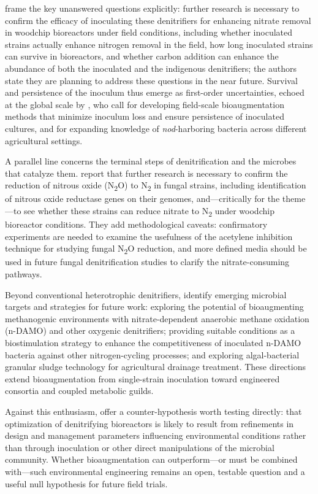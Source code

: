 \textcite{Anderson2020} frame the key unanswered questions explicitly: further research is necessary to confirm the efficacy of inoculating these denitrifiers for enhancing nitrate removal in woodchip bioreactors under field conditions, including whether inoculated strains actually enhance nitrogen removal in the field, how long inoculated strains can survive in bioreactors, and whether carbon addition can enhance the abundance of both the inoculated and the indigenous denitrifiers; the authors state they are planning to address these questions in the near future. Survival and persistence of the inoculum thus emerge as first-order uncertainties, echoed at the global scale by \textcite{Wang2025b}, who call for developing field-scale bioaugmentation methods that minimize inoculum loss and ensure persistence of inoculated cultures, and for expanding knowledge of \emph{nod}-harboring bacteria across different agricultural settings.

A parallel line concerns the terminal steps of denitrification and the microbes that catalyze them. \textcite{Aldossari2021} report that further research is necessary to confirm the reduction of nitrous oxide (N\textsubscript{2}O) to N\textsubscript{2} in fungal strains, including identification of nitrous oxide reductase genes on their genomes, and---critically for the theme---to see whether these strains can reduce nitrate to N\textsubscript{2} under woodchip bioreactor conditions. They add methodological caveats: confirmatory experiments are needed to examine the usefulness of the acetylene inhibition technique for studying fungal N\textsubscript{2}O reduction, and more defined media should be used in future fungal denitrification studies to clarify the nitrate-consuming pathways.

Beyond conventional heterotrophic denitrifiers, \textcite{Wang2025b} identify emerging microbial targets and strategies for future work: exploring the potential of bioaugmenting methanogenic environments with nitrate-dependent anaerobic methane oxidation (n-DAMO) and other oxygenic denitrifiers; providing suitable conditions as a biostimulation strategy to enhance the competitiveness of inoculated n-DAMO bacteria against other nitrogen-cycling processes; and exploring algal-bacterial granular sludge technology for agricultural drainage treatment. These directions extend bioaugmentation from single-strain inoculation toward engineered consortia and coupled metabolic guilds.

Against this enthusiasm, \textcite{Hathaway2015} offer a counter-hypothesis worth testing directly: that optimization of denitrifying bioreactors is likely to result from refinements in design and management parameters influencing environmental conditions rather than through inoculation or other direct manipulations of the microbial community. Whether bioaugmentation can outperform---or must be combined with---such environmental engineering remains an open, testable question and a useful null hypothesis for future field trials.

